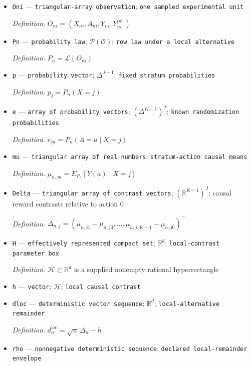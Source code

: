 \documentclass{article}
\begin{document}
\begin{itemize}
  \item \texttt{Oni} --- \texttt{triangular-\allowbreak{}array observation}; \texttt{one sampled experimental unit}
  \par\smallskip\noindent\emph{Definition.} \(O_{ni}=(X_{ni},A_{ni},Y_{ni},Y^{\mathrm{pot}}_{ni})\)
  \item \texttt{Pn} --- \texttt{probability law}; \(\mathcal P(\mathcal O)\); \texttt{row law under a local alternative}
  \par\smallskip\noindent\emph{Definition.} \(P_n=\mathcal L(O_{ni})\)
  \item \texttt{p} --- \texttt{probability vector}; \(\Delta^{J-1}\); \texttt{fixed stratum probabilities}
  \par\smallskip\noindent\emph{Definition.} \(p_j=P_n(X=j)\)
  \item \texttt{e} --- \texttt{array of probability vectors}; \((\Delta^{K-1})^J\); \texttt{known randomization probabilities}
  \par\smallskip\noindent\emph{Definition.} \(e_{ja}=P_n(A=a\mid X=j)\)
  \item \texttt{mu} --- \texttt{triangular array of real numbers}; \texttt{stratum-\allowbreak{}action causal means}
  \par\smallskip\noindent\emph{Definition.} \(\mu_{n,ja}=E_{P_n}[Y(a)\mid X=j]\)
  \item \texttt{Delta} --- \texttt{triangular array of contrast vectors}; \((\mathbb R^{K-1})^J\); causal reward contrasts relative to action \(0\)
  \par\smallskip\noindent\emph{Definition.} \(\Delta_{n,j}=(\mu_{n,j1}-\mu_{n,j0},\ldots,\mu_{n,j,K-1}-\mu_{n,j0})^{\top}\)
  \item \texttt{H} --- \texttt{effectively represented compact set}; \(\mathbb R^d\); \texttt{local-\allowbreak{}contrast parameter box}
  \par\smallskip\noindent\emph{Definition.} \(\mathcal H\subset\mathbb R^d\) is a supplied nonempty rational hyperrectangle
  \item \texttt{h} --- \texttt{vector}; \(\mathcal H\); \texttt{local causal contrast}
  \item \texttt{dloc} --- \texttt{deterministic vector sequence}; \(\mathbb R^d\); \texttt{local-\allowbreak{}alternative remainder}
  \par\smallskip\noindent\emph{Definition.} \(d_n^{\mathrm{loc}}=\sqrt n\,\Delta_n-h\)
  \item \texttt{rho} --- \texttt{nonnegative deterministic sequence}; \texttt{declared local-\allowbreak{}remainder envelope}

\end{itemize}
\end{document}
